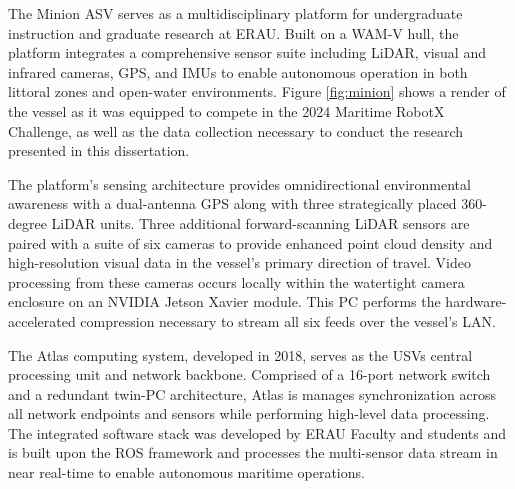 \documentclass{erauthesis}
\begin{document}

The Minion \Ac{ASV} serves as a multidisciplinary platform for undergraduate instruction and graduate research at \ac{ERAU}.
Built on a \ac{WAM-V} hull, the platform integrates a comprehensive sensor suite including \ac{LiDAR}, visual and infrared cameras, \ac{GPS}, and \acp{IMU} to enable autonomous operation in both littoral zones and open-water environments.
Figure \ref{fig:minion} shows a render of the vessel as it was equipped to compete in the 2024 Maritime RobotX Challenge, as well as the data collection necessary to conduct the research presented in this dissertation.

The platform's sensing architecture provides omnidirectional environmental awareness with a dual-antenna \ac{GPS} along with three strategically placed 360-degree \ac{LiDAR} units.
Three additional forward-scanning \ac{LiDAR} sensors are paired with a suite of six cameras to provide enhanced point cloud density and high-resolution visual data in the vessel's primary direction of travel. 
Video processing from these cameras occurs locally within the watertight camera enclosure on an NVIDIA Jetson Xavier module.
This PC performs the hardware-accelerated compression necessary to stream all six feeds over the vessel's \ac{LAN}.

The Atlas computing system, developed in 2018, serves as the \acp{USV} central processing unit and network backbone.
Comprised of a 16-port network switch and a redundant twin-PC architecture, Atlas is manages synchronization across all network endpoints and sensors while performing high-level data processing.
The integrated software stack was developed by \ac{ERAU} Faculty and students and is built upon the \ac{ROS} framework and processes the multi-sensor data stream in near real-time to enable autonomous maritime operations.
\end{document}
